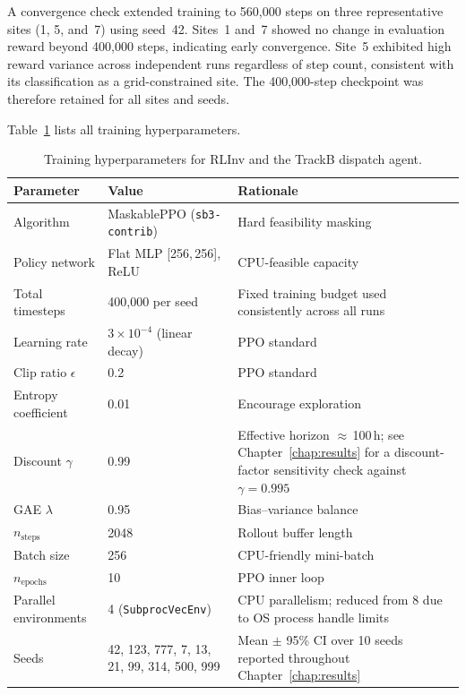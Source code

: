 A convergence check extended training to 560{,}000 steps on three
representative sites (1, 5, and~7) using seed~42. Sites~1 and~7 showed no
change in evaluation reward beyond 400{,}000 steps, indicating early
convergence. Site~5 exhibited high reward variance across independent
runs regardless of step count, consistent with its classification as a
grid-constrained site. The 400{,}000-step checkpoint was therefore
retained for all sites and seeds.

Table~\ref{tab:hyperparams} lists all training hyperparameters.

\begin{table}[htb]
\centering
\small
\caption{Training hyperparameters for RLInv and the TrackB dispatch agent.}
\label{tab:hyperparams}
\begin{tabular}{p{3.8cm}p{4.8cm}p{4.4cm}}
\toprule
\textbf{Parameter} & \textbf{Value} & \textbf{Rationale} \\
\midrule
Algorithm              & MaskablePPO (\texttt{sb3-contrib}) & Hard feasibility masking \\
Policy network         & Flat MLP [256,\,256], ReLU         & CPU-feasible capacity \\
Total timesteps        & 400{,}000 per seed                 & Fixed training budget used consistently across all runs \\
Learning rate          & $3\times10^{-4}$ (linear decay)    & PPO standard \\
Clip ratio $\epsilon$  & 0.2                                & PPO standard \\
Entropy coefficient    & 0.01                               & Encourage exploration \\
Discount $\gamma$      & 0.99                               & Effective horizon $\approx$\,100\,h; see Chapter~\ref{chap:results} for a discount-factor sensitivity check against $\gamma=0.995$ \\
GAE $\lambda$          & 0.95                               & Bias--variance balance \\
$n_{\text{steps}}$     & 2048                               & Rollout buffer length \\
Batch size             & 256                                & CPU-friendly mini-batch \\
$n_{\text{epochs}}$    & 10                                 & PPO inner loop \\
Parallel environments  & 4 (\texttt{SubprocVecEnv})         & CPU parallelism; reduced from 8 due to OS process handle limits \\
Seeds                  & 42, 123, 777, 7, 13, 21, 99, 314, 500, 999 & Mean $\pm$ 95\% CI over 10 seeds reported throughout Chapter~\ref{chap:results} \\
\bottomrule
\end{tabular}
\end{table}


